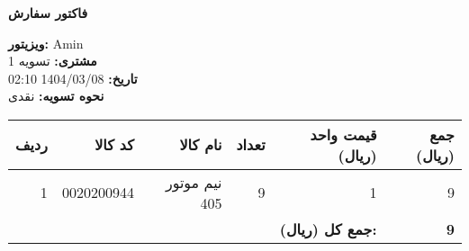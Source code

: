 \documentclass[a4paper,12pt]{article}
\begin{document}
        \begin{center}
            \textbf{\Large فاکتور سفارش}
        \end{center}
        \vspace{0.5cm}
        \begin{flushright}
            \textbf{ویزیتور:} Amin \\
            \textbf{مشتری:} تسویه 1 \\
            \textbf{تاریخ:} 1404/03/08 02:10 \\
            \textbf{نحوه تسویه:} نقدی
        \end{flushright}
        \vspace{0.5cm}
        \begin{longtable}{|r|r|r|r|r|r|}
            \hline
            \textbf{ردیف} & \textbf{کد کالا} & \textbf{نام کالا} & \textbf{تعداد} & \textbf{قیمت واحد (ریال)} & \textbf{جمع (ریال)} \\
            \hline
            \endhead
                    1 & 0020200944 & نيم موتور 405 & 9 & 1 & 9 \\
            \hline

            \hline
            \multicolumn{5}{|r|}{\textbf{جمع کل (ریال):}} & \textbf{ 9 } \\
            \hline
        \end{longtable}
        
\end{document}
